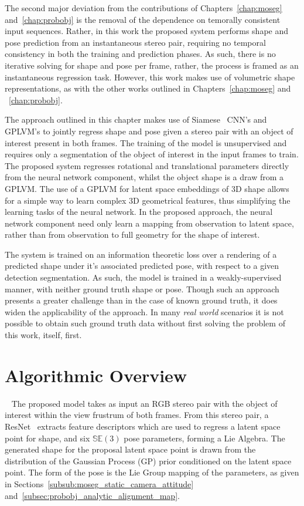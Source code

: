 The second major deviation from the contributions of Chapters~\ref{chap:moseg} and~\ref{chap:probobj} 
is the removal of the dependence on temorally consistent input sequences. Rather, in this work 
the proposed system performs shape and pose prediction from an instantaneous
stereo pair, requiring no temporal consistency in both the training and prediction 
phases. As such, there is no iterative solving for shape and pose per frame, rather, the process 
is framed as an instantaneous regression task. However, this work makes use of volumetric
shape representations, as with the other works outlined in Chapters~\ref{chap:moseg} and
~\ref{chap:probobj}.

The approach outlined in this chapter makes use of Siamese~\cite{Bromley1993} 
CNN's and GPLVM's to jointly regress shape and pose given a stereo pair with an object of interest 
present in both frames. The training of the model is unsupervised and requires only a segmentation 
of the object of interest in the input frames to train. The proposed system regresses rotational and 
translational parameters directly from the neural network component, whilst the object shape is 
a draw from a GPLVM\@. The use of a GPLVM for latent space embeddings of 3D shape allows for a simple 
way to learn complex 3D geometrical features, thus simplifying the learning tasks of the neural network. 
In the proposed approach, the neural network component need only learn a mapping from observation to latent 
space, rather than from observation to full geometry for the shape of interest.

The system is trained on an information theoretic loss over a rendering of a predicted 
shape under it's associated predicted pose, with respect to a given detection segmentation. As such, the 
model is trained in a weakly-supervised manner, with neither ground truth shape or pose. Though such an 
approach presents a greater challenge than in the case of known ground truth, it does widen the applicability 
of the approach. In many \textit{real world} scenarios it is not possible to obtain such ground truth data 
without first solving the problem of this work, itself, first.

\section{Algorithmic Overview}
~\label{sec:spp_algorithm}
The proposed model takes as input an RGB stereo pair with the object of interest within the 
view frustrum of both frames. From this stereo pair, a ResNet~\cite{He2015} extracts feature descriptors 
which are used to regress a latent space point for shape, and six \( \mathbb{SE}(3) \) pose parameters, forming 
a Lie Algebra. The generated shape for the proposal latent space point is drawn from the distribution of 
the Gaussian Process (GP) prior conditioned on the latent space point. The form of the pose is the Lie 
Group mapping of the parameters, as given in Sections~\ref{subsub:moseg_static_camera_attitude} 
and~\ref{subsec:probobj_analytic_alignment_map}. 

